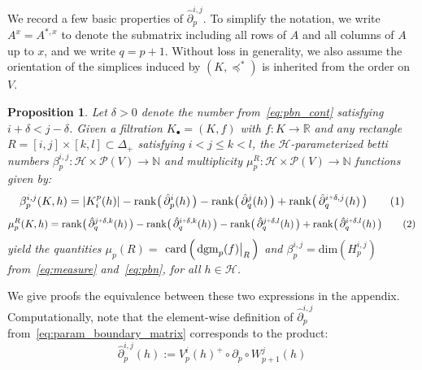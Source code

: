 \documentclass[12pt]{article}
\numberwithin{equation}{section}
\newcommand{\+}{%
	\raisebox{0.18ex}{\scaleobj{0.55}{+}}
}
\newcommand\restr[2]{{%
  \left.\kern-\nulldelimiterspace %
  #1 %
  \vphantom{\big|} %
  \right|_{#2} %
  }}
\newtheorem{proposition}{Proposition}
\theoremstyle{definition}
\newcommand\numberthis{\addtocounter{equation}{1}\tag{\theequation}}
\begin{document}
\noindent 
 We record a few basic properties of $\hat{\partial}_p^{i,j}$. To simplify the notation, we write $A^{x} = A^{\ast,x}$ to denote the submatrix including all rows of $A$ and all columns of $A$ up to $x$, and we write $q = p + 1$. 
Without loss in generality, we also assume the orientation of the simplices induced by $(K, \preceq^\ast)$ is inherited from the order on $V$. 
\begin{proposition}\label{prop:mu_betti_1}
	Let $\delta > 0$ denote the number from~\eqref{eq:pbn_cont} satisfying $i + \delta < j - \delta$. Given a filtration $K_\bullet = (K, f)$ with $f: K \to \mathbb{R}$ and any rectangle $R = [i,j] \times [k,l] \subset \Delta_{+}$ satisfying $i < j \leq k < l$, the $\mathcal{H}$-parameterized betti numbers $\beta_p^{i,j} : \mathcal{H} \times \mathcal{P}(V) \to \mathbb{N}$ and multiplicity $\mu_p^{R} : \mathcal{H} \times \mathcal{P}(V) \to \mathbb{N}$ functions given by: 
	\begin{align*}\label{eq:pbn_parameterized}
		\beta_p^{i,j}(K,h) = \lvert K_i^{p}(h) \rvert - \mathrm{rank}\big(\,\hat{\partial}_{p}^{i}(h)\,\big) - \mathrm{rank}\big(\,\hat{\partial}_{q}^{j}(h)\,\big) + \mathrm{rank}\big(\,\hat{\partial}_{q}^{i \+ \delta, j}(h)\,\big) \numberthis
	\end{align*}
	\begin{align*}\label{eq:mu_parameterized}
	\mu_p^{R}(K,h) = \mathrm{rank}\big(\,\hat{\partial}_{q}^{j \+ \delta, k}(h)\,\big) - \mathrm{rank}\big(\,\hat{\partial}_{q}^{i \+ \delta, k}(h)\,\big) - \mathrm{rank}\big(\,\hat{\partial}_{q}^{j \+ \delta, l}(h)\,\big) + \mathrm{rank}\big(\, \hat{\partial}_{q}^{i \+ \delta, l}(h)\,\big) \numberthis
	\end{align*}
	yield the quantities $\mu_p(R) = $
	$\mathrm{card} \left( \, \restr{\mathrm{dgm}_p(f)}{R} \, \right)$ and 
	$\beta_p^{i,j} = \mathrm{dim}(H_p^{i,j})$ from~\eqref{eq:measure} and~\eqref{eq:pbn}, for all $h \in \mathcal{H}$.
\end{proposition}
\noindent We give proofs the equivalence between these two expressions in the appendix. Computationally, note that the element-wise definition of $\hat{\partial}_p^{i,j}$ from~\eqref{eq:param_boundary_matrix} corresponds to the product: 
\begin{equation}
	\hat{\partial}_p^{i,j}(h) := V_p^i(h)^+ \circ \partial_p \circ W_{p+1}^j(h)
\end{equation}
\end{document}
